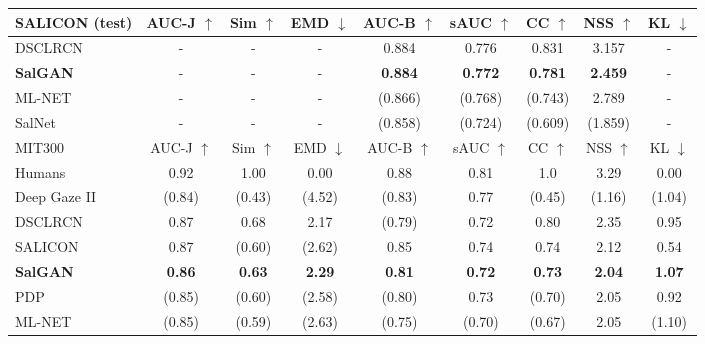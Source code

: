 \documentclass[times,twocolumn,final,authoryear]{elsarticle}
\begin{document}
\begin{table*}
\small
\begin{center}
\begin{tabular}{lcccccccc}
\hline
SALICON (test)				&	AUC-J $\uparrow$	& Sim $\uparrow$ & EMD  $\downarrow$ & AUC-B $\uparrow$ & sAUC $\uparrow$ 	& CC $\uparrow$ & NSS $\uparrow$ & KL $\downarrow$ \\		
\hline
DSCLRCN \citep{liu2018deep} 			& -					&	-			&	-				&	0.884			&	0.776			&	0.831		& 3.157			&	-				\\

\textbf{SalGAN}				& -						&	-			&	-				&	\textbf{0.884}	&	\textbf{0.772}	&	\textbf{0.781}	& \textbf{2.459} &	-				\\
ML-NET \citep{mlnet2016}		& -						&	-			&	-				&	(0.866)			&	(0.768)			&	(0.743)		& 2.789			&	-				\\
SalNet \citep{Pan_2016_CVPR}	& -						&	-			&	-				&	(0.858)			&	(0.724)			&	(0.609)		& (1.859)		&	-				\\
\hline
MIT300						&	AUC-J $\uparrow$	& Sim $\uparrow$ & EMD  $\downarrow$ & AUC-B $\uparrow$ & sAUC $\uparrow$ 	& CC $\uparrow$ & NSS $\uparrow$ & KL $\downarrow$ \\
\hline
Humans 						& 0.92	 	& 1.00		& 0.00 		& 0.88		& 0.81 		& 1.0 		& 3.29 		& 0.00	\\
Deep Gaze II \cite{kummerer2017understanding}			& (0.84)		& (0.43)	& (4.52)	& (0.83)		& 0.77		& (0.45)	& (1.16) 	& (1.04) \\
DSCLRCN \citep{liu2018deep}	& 0.87		& 0.68		& 2.17		& (0.79)	& 0.72		& 0.80		& 2.35		& 0.95\\	
SALICON	\citep{huang2015salicon}		& 0.87		& (0.60)	& (2.62)	& 0.85		& 0.74		& 0.74		& 2.12		& 0.54 \\
\textbf{SalGAN}				& \textbf{0.86}	& \textbf{0.63}		& \textbf{2.29}		& \textbf{0.81}		& \textbf{0.72}		& \textbf{0.73}	& \textbf{2.04}	& \textbf{1.07} \\
PDP	\citep{jetley2016end}	& (0.85)	& (0.60)	& (2.58)	& (0.80)	& 0.73		& (0.70)	& 2.05		& 0.92 \\
ML-NET \citep{mlnet2016}		& (0.85)	& (0.59)	& (2.63)	& (0.75)	& (0.70)	& (0.67)	& 2.05		& (1.10) \\

\end{tabular}
\end{center}
\end{table*}
\end{document}
